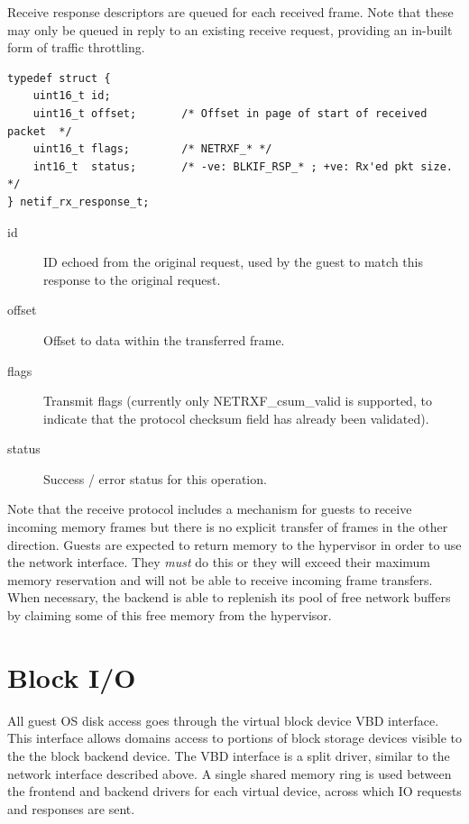 \documentclass[11pt,twoside,final,openright]{report}
\begin{document}
Receive response descriptors are queued for each received frame.  Note
that these may only be queued in reply to an existing receive request,
providing an in-built form of traffic throttling.

\scriptsize
\begin{verbatim}
typedef struct {
    uint16_t id;
    uint16_t offset;       /* Offset in page of start of received packet  */
    uint16_t flags;        /* NETRXF_* */
    int16_t  status;       /* -ve: BLKIF_RSP_* ; +ve: Rx'ed pkt size. */
} netif_rx_response_t;
\end{verbatim}
\normalsize

\begin{description}
\item[id] ID echoed from the original request, used by the guest to
  match this response to the original request.
\item[offset] Offset to data within the transferred frame.
\item[flags] Transmit flags (currently only NETRXF\_csum\_valid is
  supported, to indicate that the protocol checksum field has already
  been validated).
\item[status] Success / error status for this operation.
\end{description}

Note that the receive protocol includes a mechanism for guests to
receive incoming memory frames but there is no explicit transfer of
frames in the other direction.  Guests are expected to return memory
to the hypervisor in order to use the network interface.  They {\em
must} do this or they will exceed their maximum memory reservation and
will not be able to receive incoming frame transfers.  When necessary,
the backend is able to replenish its pool of free network buffers by
claiming some of this free memory from the hypervisor.

\section{Block I/O}

All guest OS disk access goes through the virtual block device VBD
interface.  This interface allows domains access to portions of block
storage devices visible to the the block backend device.  The VBD
interface is a split driver, similar to the network interface
described above.  A single shared memory ring is used between the
frontend and backend drivers for each virtual device, across which
IO requests and responses are sent.
\end{document}
